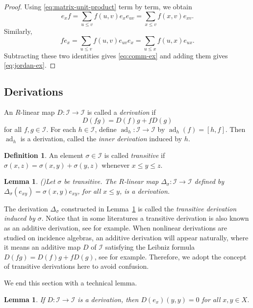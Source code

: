 \documentclass[reqno]{amsart}
\numberwithin{equation}{section}
\theoremstyle{plain}
\newtheorem{lemma}[theorem]{Lemma}
\theoremstyle{definition}
\newtheorem{definition}[theorem]{Definition}
\newcommand{\I}{\mathcal I}
\newcommand{\ad}{\operatorname{ad}}
\begin{document}
\begin{proof}
Using \eqref{eq:matrix-unit-product} term by term, we obtain
\[
e_xf
=\sum_{u\leq v}f(u,v)e_xe_{uv}
=\sum_{x\leq v}f(x,v)e_{xv}.
\]
Similarly,
\[
fe_x
=\sum_{u\leq v}f(u,v)e_{uv}e_x
=\sum_{u\leq x}f(u,x)e_{ux}.
\]
Subtracting these two identities gives \eqref{eq:comm-ex} and adding them gives \eqref{eq:jordan-ex}.
\end{proof}

\subsection{Derivations}

An $R$-linear map $D:\I\to\I$ is called a \emph{derivation} if
\[
D(fg)=D(f)g+fD(g)
\]
for all $f,g\in\I$. For each $h\in\I$, define
$\ad_h:\I\to\I$ by $\ad_h(f)=[h,f]$. Then $\ad_h$ is a
derivation, called the \emph{inner derivation} induced by $h$.

\begin{definition}\label{def:transitive}
An element $\sigma\in \I$ is called \emph{transitive} if
$\sigma(x,z)=\sigma(x,y)+\sigma(y,z)$
whenever $x\leq y\leq z$.
\end{definition}

\begin{lemma}{\rm(\cite[Lemma 2.3]{Xiao})}\label{lem:transitive-derivation}
Let $\sigma$ be transitive. The $R$-linear map $\Delta_\sigma:\I\to\I$
defined by $\Delta_\sigma(e_{xy})=\sigma(x,y)e_{xy}$, for all $x\leq y$, is a
derivation.
\end{lemma}

The derivation $\Delta_\sigma$ constructed in
Lemma~\ref{lem:transitive-derivation} is called the
\emph{transitive derivation induced by $\sigma$}.
Notice that in some literatures a transitive derivation is also known as an additive derivation,
see \cite[Section 7.1]{SpDo} for example. When nonlinear derivations are studied on incidence algebras,
an additive derivation will appear naturally, where it means an additive map $D$ of $\I$ satisfying
the Leibniz formula $D(fg)=D(f)g+fD(g)$, see \cite{Yang19} for example.
Therefore, we adopt the concept of transitive derivations here to avoid confusion.

We end this section with a technical lemma.

\begin{lemma}\label{lem:derivation-diagonal}
If $D:\I\to\I$ is a derivation, then
$D(e_x)(y,y)=0$ for all $x,y\in X$.
\end{lemma}
\end{document}

